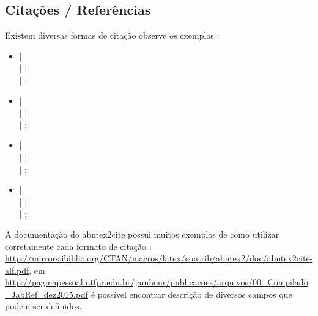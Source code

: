 \subsection{Citações / Referências}
\label{referencias}

Existem diversas formas de citação observe os exemplos :

\begin{itemize}
    \item \cite{UML:JACOBSON} | \cite{POWELL:2006} \\ 
        \cite{SCRUMGUIDE:2013} | \cite{urani1994} |\\
        \cite{ETAL5} | \cite{ETAL4}; 
    

    \item {} |  \\
         |  | \\
         | ;

    \item {}|  \\
         |  | \\
         | ;

    \item \citeauthor{UML:JACOBSON}| \citeauthor{POWELL:2006} \\
        \citeauthor{SCRUMGUIDE:2013}| \citeauthor{urani1994} | \\
        \citeauthor{ETAL5} | \citeauthor{ETAL4};
    
    
\end{itemize}

A documentação do abntex2cite possui muitos exemplos de como utilizar corretamente cada formato de citação : \url{http://mirrors.ibiblio.org/CTAN/macros/latex/contrib/abntex2/doc/abntex2cite-alf.pdf},  em \url{http://paginapessoal.utfpr.edu.br/jamhour/publicacoes/arquivos/00_Compilado_JabRef_dez2015.pdf} é possível encontrar descrição de diversos campos que podem ser definidos.

